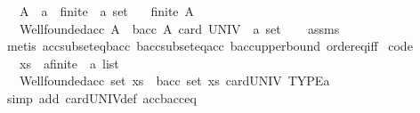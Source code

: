 \begin{isabellebody}
\ \ \ A\ {\isacharcolon}{\kern0pt}{\isacharcolon}{\kern0pt}\ {\isachardoublequoteopen}{\isacharparenleft}{\kern0pt}{\isacharprime}{\kern0pt}a\ {\isacharcolon}{\kern0pt}{\isacharcolon}{\kern0pt}\ finite\ {\isasymtimes}\ {\isacharprime}{\kern0pt}a{\isacharparenright}{\kern0pt}\ set{\isachardoublequoteclose}\isanewline
\ \ \ {\isachardoublequoteopen}finite\ A{\isachardoublequoteclose}\isanewline
\ \ \ {\isachardoublequoteopen}Wellfounded{\isachardot}{\kern0pt}acc\ A\ {\isacharequal}{\kern0pt}\ bacc\ A\ {\isacharparenleft}{\kern0pt}card\ {\isacharparenleft}{\kern0pt}UNIV\ {\isacharcolon}{\kern0pt}{\isacharcolon}{\kern0pt}\ {\isacharprime}{\kern0pt}a\ set{\isacharparenright}{\kern0pt}{\isacharparenright}{\kern0pt}{\isachardoublequoteclose}\isanewline
%
\isadelimproof
\ \ %
\endisadelimproof
%
\isatagproof
{}\isamarkupfalse%
\ assms\ \isamarkupfalse%
\ {\isacharparenleft}{\kern0pt}metis\ acc{\isacharunderscore}{\kern0pt}subseteq{\isacharunderscore}{\kern0pt}bacc\ bacc{\isacharunderscore}{\kern0pt}subseteq{\isacharunderscore}{\kern0pt}acc\ bacc{\isacharunderscore}{\kern0pt}upper{\isacharunderscore}{\kern0pt}bound\ order{\isacharunderscore}{\kern0pt}eq{\isacharunderscore}{\kern0pt}iff{\isacharparenright}{\kern0pt}%
\endisatagproof
{\isafoldproof}%
%
\isadelimproof
\isanewline
%
\endisadelimproof
\isanewline
{}\isamarkupfalse%
\ {\isacharbrackleft}{\kern0pt}code{\isacharbrackright}{\kern0pt}{\isacharcolon}{\kern0pt}\isanewline
\ \ \ xs\ {\isacharcolon}{\kern0pt}{\isacharcolon}{\kern0pt}\ {\isachardoublequoteopen}{\isacharparenleft}{\kern0pt}{\isacharprime}{\kern0pt}a{\isacharcolon}{\kern0pt}{\isacharcolon}{\kern0pt}finite\ {\isasymtimes}\ {\isacharprime}{\kern0pt}a{\isacharparenright}{\kern0pt}\ list{\isachardoublequoteclose}\isanewline
\ \ \ {\isachardoublequoteopen}Wellfounded{\isachardot}{\kern0pt}acc\ {\isacharparenleft}{\kern0pt}set\ xs{\isacharparenright}{\kern0pt}\ {\isacharequal}{\kern0pt}\ bacc\ {\isacharparenleft}{\kern0pt}set\ xs{\isacharparenright}{\kern0pt}\ {\isacharparenleft}{\kern0pt}card{\isacharunderscore}{\kern0pt}UNIV\ TYPE{\isacharparenleft}{\kern0pt}{\isacharprime}{\kern0pt}a{\isacharparenright}{\kern0pt}{\isacharparenright}{\kern0pt}{\isachardoublequoteclose}\isanewline
%
\isadelimproof
\ \ %
\endisadelimproof
%
\isatagproof
{}\isamarkupfalse%
\ {\isacharparenleft}{\kern0pt}simp\ add{\isacharcolon}{\kern0pt}\ card{\isacharunderscore}{\kern0pt}UNIV{\isacharunderscore}{\kern0pt}def\ acc{\isacharunderscore}{\kern0pt}bacc{\isacharunderscore}{\kern0pt}eq{\isacharparenright}{\kern0pt}%

\end{isabellebody}
